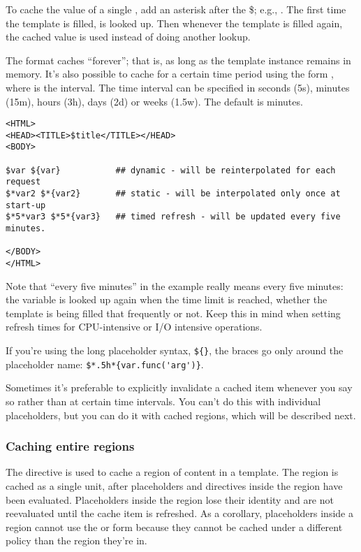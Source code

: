To cache the value of a single , add an asterisk after the
\$; e.g.,  .  The first time the template is
filled,  is looked up.  Then whenever the template is filled again,
the cached value is used instead of doing another lookup.  

The \code{\$*} format caches ``forever''; that is, as long as the template
instance remains in memory.  It's also possible to cache for a certain time
period using the form , where  is
the interval.  The time interval can be specified in seconds (5s), minutes
(15m), hours (3h), days (2d) or weeks (1.5w). The default is minutes.

\begin{verbatim}
<HTML>
<HEAD><TITLE>$title</TITLE></HEAD>
<BODY>

$var ${var}           ## dynamic - will be reinterpolated for each request
$*var2 $*{var2}       ## static - will be interpolated only once at start-up
$*5*var3 $*5*{var3}   ## timed refresh - will be updated every five minutes.

</BODY>
</HTML>
\end{verbatim}

Note that ``every five minutes'' in the example really means every five
minutes: the variable is looked up again when the time limit is reached,
whether the template is being filled that frequently or not.  Keep this in
mind when setting refresh times for CPU-intensive or I/O intensive 
operations.

If you're using the long placeholder syntax, \verb+${}+, the braces go only
around the placeholder name: \verb+$*.5h*{var.func('arg')}+.

Sometimes it's preferable to explicitly invalidate a cached item whenever
you say so rather than at certain time intervals.  You can't do this with
individual placeholders, but you can do it with cached regions, which will
be described next.

\subsubsection{Caching entire regions}
\label{output.caching.regions}

The  directive is used to cache a region of
content in a template.  The region is cached as a single unit, after 
placeholders and directives inside the region have been evaluated.  
Placeholders inside the region lose their identity and are not reevaluated
until the cache item is refreshed.  As a corollary, placeholders inside a
 region cannot use the  or 
form because they cannot be cached under a different policy than the region
they're in.

